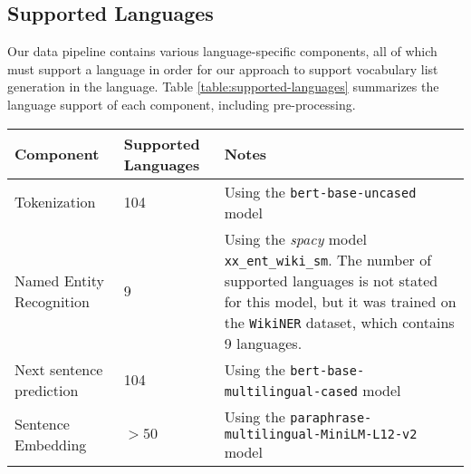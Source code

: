 \subsection{Supported Languages}
Our data pipeline contains various language-specific components, all of which must support a language in order for our approach to support vocabulary list generation in the language.
Table \ref{table:supported-languages} summarizes the language support of each component, including pre-processing.

{
\renewcommand{\arraystretch}{1.5}  %
\begin{table}[H]
	\centering
	\begin{tabularx}{\textwidth}{|X|X|X|}
		\hline
		\textbf{Component}                          & \textbf{Supported Languages} & \textbf{Notes}                                                                                                                                                                                                                             \\
		\hline
		Tokenization                                & 104                          & Using the \texttt{bert-base-uncased} model\footnotemark[1]                                                                                                                                                                                 \\
		\hline
		Named Entity Recognition                    & 9                            & Using the \textit{spacy} model \texttt{xx\_ent\_wiki\_sm}\footnotemark[2]. The number of supported languages is not stated for this model, but it was trained on the \texttt{WikiNER} dataset\footnotemark[3], which contains 9 languages. \\
		\hline
		Next sentence prediction                    & 104                          & Using the \texttt{bert-base-multilingual-cased} model\footnotemark[4]                                                                                                                                                                      \\
		\hline
		Sentence Embedding                          & $>50$                        & Using the \texttt{paraphrase-multilingual-MiniLM-L12-v2} model\footnotemark[5]                                                                                                                                                             \\
		\hline

\end{tabularx}
\end{table}}
